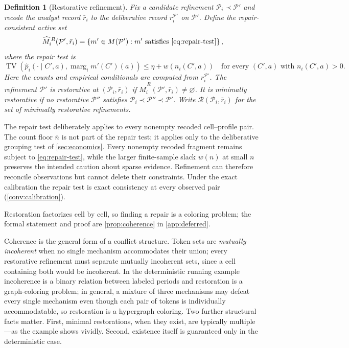 \documentclass[11pt]{article}
\newtheorem{definition}[assumption]{Definition}
\theoremstyle{definition}
\newcommand{\emptysetset}{\varnothing}
\newcommand{\TV}{\operatorname{TV}}
\newcommand{\marg}[1]{\operatorname{marg}_{#1}}
\begin{document}
\begin{definition}[Restorative refinement]
\label{def:restorative}
Fix a candidate refinement $\mathcal P_i\prec\mathcal P'$ and recode the analyst record $\bar r_i$ to the deliberative record $r_i^{\mathcal P'}$ on $\mathcal P'$.
Define the \emph{repair-consistent active set}
\[
\widehat M_i^{\,R}(\mathcal P',\bar r_i)
=
\left\{
m'\in M(\mathcal P'):
m'\text{ satisfies \cref{eq:repair-test}}
\right\},
\]
where the \emph{repair test} is
\begin{equation}
\TV\!\left(
\hat p_i(\cdot\mid C',a),
\marg{i}m'(C')(a)
\right)
\leq
\eta+w\!\left(n_i(C',a)\right)
\quad
\text{for every $(C',a)$ with }n_i(C',a)>0.
\label{eq:repair-test}
\end{equation}
Here the counts and empirical conditionals are computed from $r_i^{\mathcal P'}$.
The refinement $\mathcal P'$ is \emph{restorative} at $(\mathcal P_i,\bar r_i)$ if $\widehat M_i^{\,R}(\mathcal P',\bar r_i)\neq\emptysetset$.
It is \emph{minimally restorative} if no restorative $\mathcal P''$ satisfies $\mathcal P_i\prec\mathcal P''\prec\mathcal P'$.
Write $\mathcal R(\mathcal P_i,\bar r_i)$ for the set of minimally restorative refinements.
\end{definition}

The repair test deliberately applies to every nonempty recoded cell--profile pair.
The count floor $\bar n$ is not part of the repair test; it applies only to the deliberative grouping test of \cref{sec:economics}.
Every nonempty recoded fragment remains subject to \cref{eq:repair-test}, while the larger finite-sample slack $w(n)$ at small $n$ preserves the intended caution about sparse evidence.
Refinement can therefore reconcile observations but cannot delete their constraints.
Under the exact calibration the repair test is exact consistency at every observed pair (\cref{conv:calibration}).

Restoration factorizes cell by cell, so finding a repair is a coloring problem; the formal statement and proof are \cref{prop:coherence} in \cref{app:deferred}.

Coherence is the general form of a conflict structure.
Token sets are \emph{mutually incoherent} when no single mechanism accommodates their union; every restorative refinement must separate mutually incoherent sets, since a cell containing both would be incoherent.
In the deterministic running example incoherence is a binary relation between labeled periods and restoration is a graph-coloring problem; in general, a mixture of three mechanisms may defeat every single mechanism even though each pair of tokens is individually accommodatable, so restoration is a hypergraph coloring.
Two further structural facts matter.
First, minimal restorations, when they exist, are typically multiple---as the example shows vividly.
Second, existence itself is guaranteed only in the deterministic case.
\end{document}

